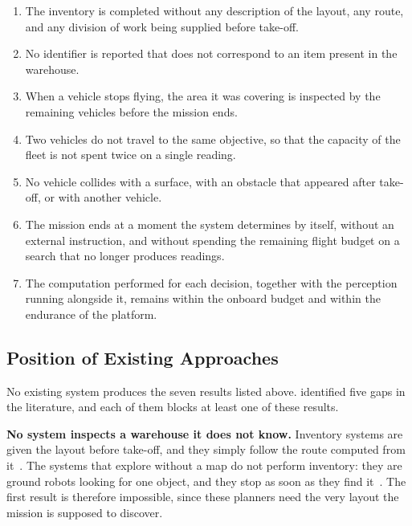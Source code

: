 \begin{enumerate}[itemsep=0.5em]
    \item The inventory is completed without any description of the layout, any
          route, and any division of work being supplied before take-off.
    \item No identifier is reported that does not correspond to an item present
          in the warehouse.
    \item When a vehicle stops flying, the area it was covering is inspected by
          the remaining vehicles before the mission ends.
    \item Two vehicles do not travel to the same objective, so that the capacity
          of the fleet is not spent twice on a single reading.
    \item No vehicle collides with a surface, with an obstacle that appeared
          after take-off, or with another vehicle.
    \item The mission ends at a moment the system determines by itself, without
          an external instruction, and without spending the remaining flight
          budget on a search that no longer produces readings.
    \item The computation performed for each decision, together with the
          perception running alongside it, remains within the onboard budget and
          within the endurance of the platform.
\end{enumerate}
\subsection{Position of Existing Approaches}%
\label{subsec:sys:position}

No existing system produces the seven results listed above.
 identified five gaps in the literature, and each of them blocks
at least one of these results.

\textbf{No system inspects a warehouse it does not know.} Inventory systems are
given the layout before take-off, and they simply follow the route computed from
it~\cite{kalinov2020warevision, pore2026uavqr, cristiani2020inventory,
    kwon2020robust, guinand2021uavugv}. The systems that explore without a map do
not perform inventory: they are ground robots looking for one object, and they
stop as soon as they find it~\cite{yokoyama2024vlfm, yu2023l3mvn}. The first
result is therefore impossible, since these planners need the very layout the
mission is supposed to discover.

